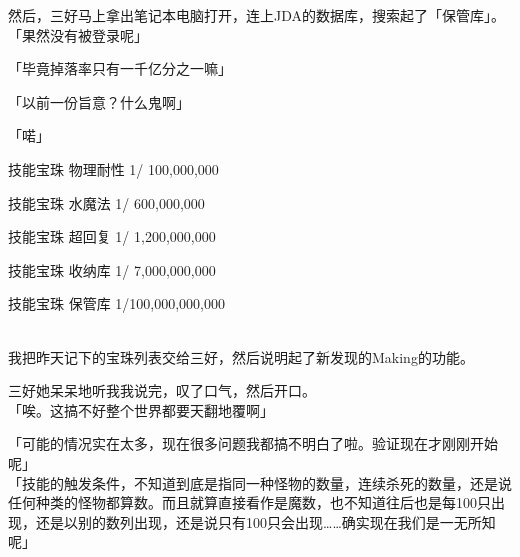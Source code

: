然后，三好马上拿出笔记本电脑打开，连上JDA的数据库，搜索起了「保管库」。\\

「果然没有被登录呢」

「毕竟掉落率只有一千亿分之一嘛」

「以前一份旨意？什么鬼啊」

「喏」\\

\cardline

  技能宝珠  物理耐性 1/    100,000,000

  技能宝珠    水魔法 1/    600,000,000

  技能宝珠    超回复 1/  1,200,000,000

  技能宝珠    收纳库 1/  7,000,000,000

  技能宝珠    保管库 1/100,000,000,000

\cardline\\


我把昨天记下的宝珠列表交给三好，然后说明起了新发现的Making的功能。

三好她呆呆地听我我说完，叹了口气，然后开口。\\

「唉。这搞不好整个世界都要天翻地覆啊」

「可能的情况实在太多，现在很多问题我都搞不明白了啦。验证现在才刚刚开始呢」\\

「技能的触发条件，不知道到底是指同一种怪物的数量，连续杀死的数量，还是说任何种类的怪物都算数。而且就算直接看作是魔数，也不知道往后也是每100只出现，还是以别的数列出现，还是说只有100只会出现……确实现在我们是一无所知呢」

